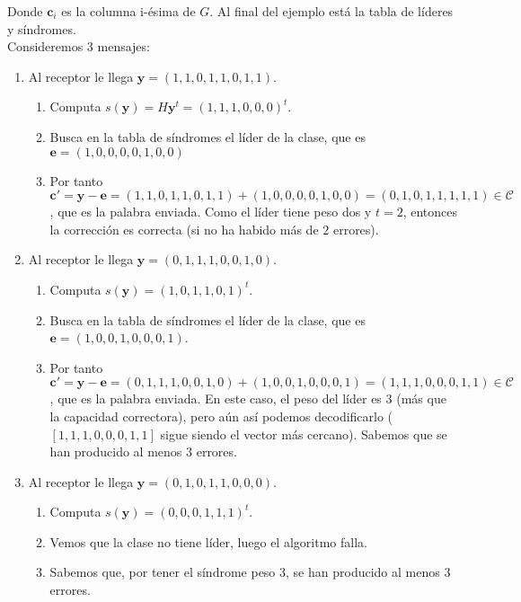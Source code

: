 \documentclass[11pt,spanish]{book}
\begin{document}
Donde $\mathbf{c}_i$ es la columna i-ésima de $G$. Al final del ejemplo está la tabla de líderes y síndromes.\\

Consideremos 3 mensajes:
\begin{enumerate}
    \item Al receptor le llega $\mathbf{y}=(1,1,0,1,1,0,1,1)$.
    \begin{enumerate}
        \item Computa $s(\mathbf{y})=H\mathbf{y}^t=(1,1,1,0,0,0)^t$.
        \item Busca en la tabla de síndromes el líder de la clase, que es $\mathbf{e}=(1,0,0,0,0,1,0,0)$
        \item Por tanto $\mathbf{c'}=\mathbf{y}-\mathbf{e}=(1,1,0,1,1,0,1,1)+(1,0,0,0,0,1,0,0)=(0,1,0,1,1,1,1,1)\in\mathcal{C}$, que es la palabra enviada. Como el líder tiene peso dos y $t=2$, entonces la corrección es correcta (si no ha habido más de $2$ errores).
    \end{enumerate}
    \item Al receptor le llega $\mathbf{y}=(0,1,1,1,0,0,1,0)$. 
     \begin{enumerate}
        \item Computa $s(\mathbf{y})=(1,0,1,1,0,1)^t$.
        \item Busca en la tabla de síndromes el líder de la clase, que es $\mathbf{e}=(1,0,0,1,0,0,0,1)$.
        \item Por tanto $\mathbf{c'}=\mathbf{y}-\mathbf{e}=(0,1,1,1,0,0,1,0)+(1,0,0,1,0,0,0,1)=(1,1,1,0,0,0,1,1)\in\mathcal{C}$, que es la palabra enviada. En este caso, el peso del líder es $3$ (más que la capacidad correctora), pero aún así podemos decodificarlo ($[1,1,1,0,0,0,1,1]$ sigue siendo el vector más cercano). Sabemos que se han producido al menos $3$ errores.
    \end{enumerate}
     \item Al receptor le llega $\mathbf{y}=(0,1,0,1,1,0,0,0)$. 
     \begin{enumerate}
        \item Computa $s(\mathbf{y})=(0,0,0,1,1,1)^t$.
        \item Vemos que la clase no tiene líder, luego el algoritmo falla.
        \item Sabemos que, por tener el síndrome peso $3$, se han producido al menos 3 errores.  
    \end{enumerate}
\end{enumerate}
\end{document}
